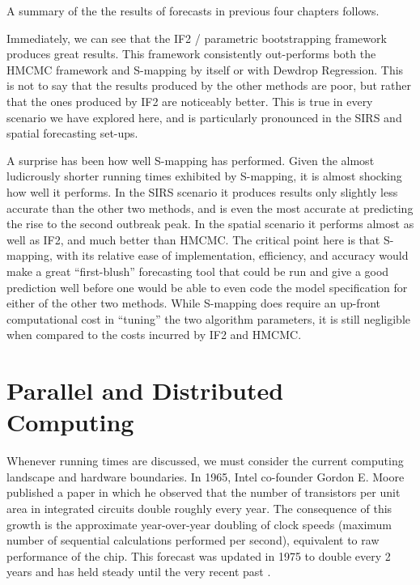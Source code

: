 

	A summary of the the results of forecasts in previous four chapters follows.

	Immediately, we can see that the IF2 / parametric bootstrapping framework produces great results. This framework consistently out-performs both the HMCMC framework and S-mapping by itself or with Dewdrop Regression. This is not to say that the results produced by the other methods are poor, but rather that the ones produced by IF2 are noticeably better. This is true in every scenario we have explored here, and is particularly pronounced in the SIRS and spatial forecasting set-ups.

	A surprise has been how well S-mapping has performed. Given the almost ludicrously shorter running times exhibited by S-mapping, it is almost shocking how well it performs. In the SIRS scenario it produces results only slightly less accurate than the other two methods, and is even the most accurate at predicting the rise to the second outbreak peak. In the spatial scenario it performs almost as well as IF2, and much better than HMCMC. The critical point here is that S-mapping, with its relative ease of implementation, efficiency, and accuracy would make a great ``first-blush'' forecasting tool that could be run and give a good prediction well before one would be able to even code the model specification for either of the other two methods. While S-mapping does require an up-front computational cost in ``tuning'' the two algorithm parameters, it is still negligible when compared to the costs incurred by IF2 and HMCMC.


\section{Parallel and Distributed Computing}

	Whenever running times are discussed, we must consider the current computing landscape and hardware boundaries. In 1965, Intel co-founder Gordon E. Moore published a paper in which he observed that the number of transistors per unit area in integrated circuits double roughly every year. The consequence of this growth is the approximate year-over-year doubling of clock speeds (maximum number of sequential calculations performed per second), equivalent to raw performance of the chip. This forecast was updated in 1975 to double every 2 years and has held steady until the very recent past \cite{Waldrop2016}.

